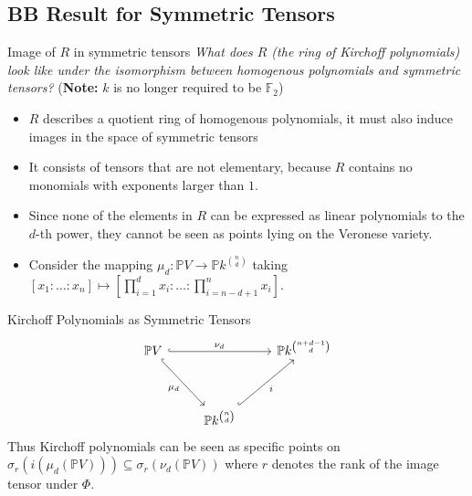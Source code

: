 \documentclass{beamer}
\def\proj{\mathbb{P}} %
\def\field{\mathbb{F}} %
\begin{document}
\subsection{BB Result for Symmetric Tensors}
\begin{frame}{Image of $R$ in symmetric tensors}
    \textit{What does $R$ (the ring of Kirchoff polynomials) look like under the isomorphism between homogenous polynomials and symmetric tensors?} (\textbf{Note:} $k$ is no longer required to be $\field_2$)
    \begin{itemize}
        \item<1-> $R$ describes a quotient ring of homogenous polynomials, it must also induce images in the space of symmetric tensors
        \item<2-> It consists of tensors that are not elementary, because $R$ contains no monomials with exponents larger than $1$. 
        \item<3-> Since none of the elements in $R$ can be expressed as linear polynomials to the $d$-th power, they cannot be seen as points lying on the Veronese variety.
        \item<4-> Consider the mapping $\mu_d: \proj V \to \proj k^{\binom{n}{d}}$ taking $[x_1: \ldots:x_n] \mapsto [\prod_{i=1}^d x_i: \ldots: \prod_{i=n-d+1}^{n}x_i]$. 
    \end{itemize}
\end{frame}
\begin{frame}{Kirchoff Polynomials as Symmetric Tensors}
\[\begin{tikzcd}[ampersand replacement=\&]
	{\mathbb{P}V} \&\& {\mathbb{P}k^{\binom{n+d-1}{d}}} \\
	\\
	\& {\mathbb{P}k^{\binom{n}{d}}}
	\arrow["{\nu_d}", hook, from=1-1, to=1-3]
	\arrow["{\mu_d}"', hook, from=1-1, to=3-2]
	\arrow["i"', hook, from=3-2, to=1-3]
\end{tikzcd}\]
Thus Kirchoff polynomials can be seen as specific points on $\sigma_r(i(\mu_d(\proj V))) \subseteq \sigma_r(\nu_d(\proj V))$ where $r$ denotes the rank of the image tensor under $\Phi$.
\end{frame}
\end{document}
